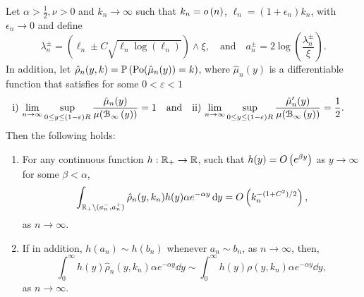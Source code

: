 \begin{lemma}\label{lem:concentration_argument_rho_approximation}
Let $\alpha > \frac{1}{2}, \nu > 0$ and $k_n \to \infty$ such that $k_n = o\left(n\right)$, $\ell_n = (1 + \epsilon_n)k_n$, with $\epsilon_n \to 0$ and define
\[
	\lambda_n^\pm = (\ell_n \pm C \sqrt{\ell_n \log(\ell_n)}) \wedge \xi, \quad \text{and} \quad a_n^\pm = 2 \log\left(\frac{\lambda_n^\pm}{\xi}\right).
\] 
In addition, let $\hat{\rho}_n(y,k) = \mathbb{P}\left({\mathrm{Po}}(\hat{\mu}_n(y)) = k\right)$, where $\hat{\mu}_n(y)$ is a differentiable function that satisfies for some $0 < \varepsilon < 1$
\begin{align*}
	&\mathrm{i)} \, \lim_{n \to \infty} \sup_{0 \le y \le (1 - \varepsilon)R} \frac{\hat{\mu}_n(y)}{\mu({\mathcal B}_{\infty}\left(y\right))} = 1
	\quad \text{and}
	&&\mathrm{ii)} \, \lim_{n \to \infty}  \sup_{0 \le y \le (1 - \varepsilon)R} \frac{\hat{\mu}_n^\prime(y)}{\mu({\mathcal B}_{\infty}\left(y\right))} = \frac{1}{2}.
\end{align*}
%
%
Then the following holds:
\begin{enumerate}
\item For any continuous function $h : {\mathbb R}_+ \rightarrow  {\ensuremath{\mathbb R}}$, such that $h(y) = O\left(e^{\beta y}\right)$ as $y \to \infty$ for some $\beta < \alpha$, 
\begin{equation}\label{eq:error_bound_int_rho_approx_not_K}
	\int_{{\mathbb R}_+ \setminus (a_n^-, a_n^+)} \hat{\rho}_n(y,k_n) h(y) \alpha e^{-\alpha y} \operatorname{\mathrm{d}\hspace{-2pt}} y
	= O\left(k_n^{-(1+C^2)/2}\right),
\end{equation}
as $n \to \infty$.
\item If in addition, $h(a_n) \sim h(b_n)$ whenever $a_n \sim b_n$, as $n \to \infty$, then,
\begin{equation}\label{eq:concentration_h_rho_approx}
	\int_0^\infty h(y) \hat{\rho}_n(y,k_n) \alpha e^{-\alpha y} \dd y \sim  
		\int_0^\infty h(y) \rho(y,k_n) \alpha e^{-\alpha y} \dd y,
\end{equation}
as $n \to \infty$.
\end{enumerate}
\end{lemma}

